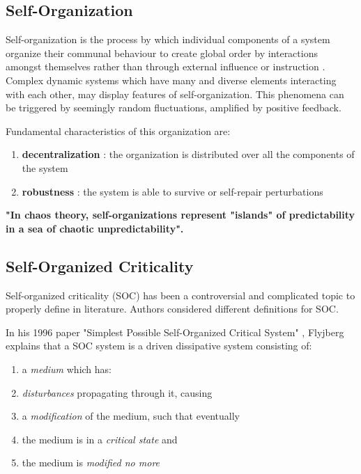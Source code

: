\subsection{Self-Organization}
Self-organization is the process by which individual components of a system organize their communal behaviour to create global order by interactions amongst themselves rather than through external influence or instruction \cite{willshawSO}. Complex dynamic systems which have many and diverse elements interacting with each other, may display features of self-organization. This phenomena can be triggered by seemingly random fluctuations, amplified by positive feedback.\par 
Fundamental characteristics of this organization are:
\begin{enumerate}
	\item {\bf decentralization} : the organization is distributed over all the components of the system
	\item {\bf robustness} : the system is able to survive or self-repair perturbations
\end{enumerate}
{\bf "In chaos theory, self-organizations represent "islands" of predictability in a sea of chaotic unpredictability".}


\subsection{Self-Organized Criticality}
Self-organized criticality (SOC) has been a controversial and complicated topic to properly define in literature. Authors considered different definitions for SOC.


In his 1996 paper "Simplest Possible Self-Organized Critical System" \cite{simplestSOC}, Flyjberg explains that a SOC system is a driven dissipative system consisting of:
\begin{enumerate}
	\item a {\it medium} which has:
	\item {\it disturbances} propagating through it, causing
	\item a {\it modification} of the medium, such that eventually
	\item the medium is in a {\it critical state} and
	\item the medium is {\it modified no more}
\end{enumerate}


